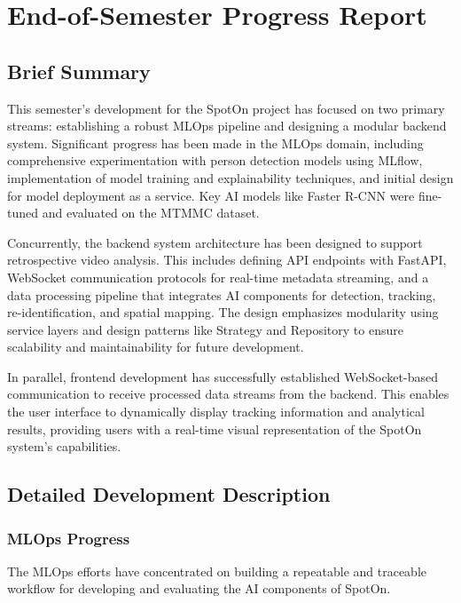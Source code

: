 
\chapter*{End-of-Semester Progress Report} %
\label{chap:progress_report}

\section*{Brief Summary}
\label{sec:progress_summary}
This semester's development for the SpotOn project has focused on two primary streams: establishing a robust MLOps pipeline and designing a modular backend system. Significant progress has been made in the MLOps domain, including comprehensive experimentation with person detection models using MLflow, implementation of model training and explainability techniques, and initial design for model deployment as a service. Key AI models like Faster R-CNN were fine-tuned and evaluated on the MTMMC dataset.

Concurrently, the backend system architecture has been designed to support retrospective video analysis. This includes defining API endpoints with FastAPI, WebSocket communication protocols for real-time metadata streaming, and a data processing pipeline that integrates AI components for detection, tracking, re-identification, and spatial mapping. The design emphasizes modularity using service layers and design patterns like Strategy and Repository to ensure scalability and maintainability for future development.

In parallel, frontend development has successfully established WebSocket-based communication to receive processed data streams from the backend. This enables the user interface to dynamically display tracking information and analytical results, providing users with a real-time visual representation of the SpotOn system's capabilities.


\section*{Detailed Development Description}
\label{sec:progress_detailed_development}

\subsection*{MLOps Progress}
\label{subsec:progress_mlops}
The MLOps efforts have concentrated on building a repeatable and traceable workflow for developing and evaluating the AI components of SpotOn.


